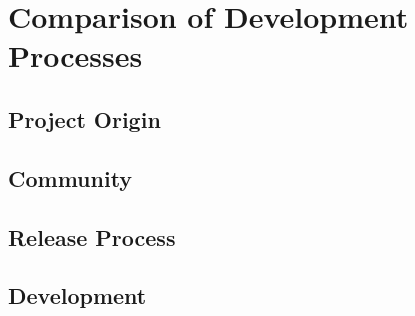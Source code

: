 \chapter{Comparison of Development Processes} %
\label{cha:Comparison of Development Processes}

\section{Project Origin} %
\label{sec:Project Origin}


\section{Community} %
\label{sec:Community}


\section{Release Process} %
\label{sec:Release Process}


\section{Development} %
\label{sec:Development}


